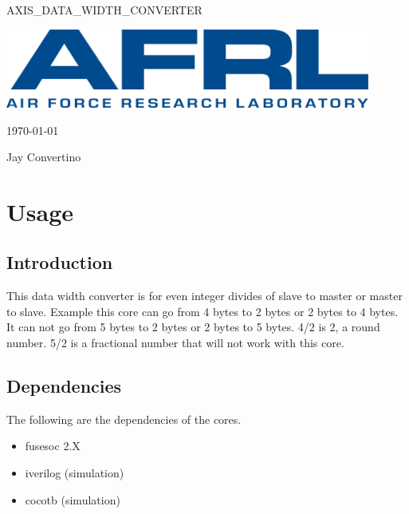 \begin{titlepage}
  \begin{center}

  {\Huge AXIS\_DATA\_WIDTH\_CONVERTER}

  \vspace{25mm}

  \includegraphics[width=0.90\textwidth,height=\textheight,keepaspectratio]{img/AFRL.png}

  \vspace{25mm}

  \today

  \vspace{15mm}

  {\Large Jay Convertino}

  \end{center}
\end{titlepage}

\tableofcontents

\newpage

\section{Usage}

\subsection{Introduction}

\par
This data width converter is for even integer divides of slave to master or
master to slave. Example this core can go from 4 bytes to 2 bytes or 2 bytes to
4 bytes. It can not go from 5 bytes to 2 bytes or 2 bytes to 5 bytes. 4/2 is 2, a
round number. 5/2 is a fractional number that will not work with this core.

\subsection{Dependencies}

\par
The following are the dependencies of the cores.

\begin{itemize}
  \item fusesoc 2.X
  \item iverilog (simulation)
  \item cocotb (simulation)
\end{itemize}

